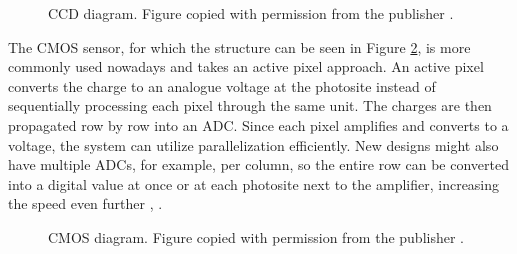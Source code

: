 \begin{figure}
    \centering
    \caption{CCD diagram. Figure copied with permission from the publisher \cite[4]{Park2016}.}
    \label{fig:ccd}
\end{figure}

 The CMOS sensor, for which the structure can be seen in Figure \ref{fig:cmos}, is more commonly used nowadays and takes an active pixel approach. An active pixel converts the charge to an analogue voltage at the photosite instead of sequentially processing each pixel through the same unit. The charges are then propagated row by row into an ADC. Since each pixel amplifies and converts to a voltage, the system can utilize parallelization efficiently. New designs might also have multiple ADCs, for example, per column, so the entire row can be converted into a digital value at once or at each photosite next to the amplifier, increasing the speed even further  \cite[144-176]{nakamura}, \cite[5]{Park2016}.

\begin{figure}
    \centering
    \caption{CMOS diagram. Figure copied with permission from the publisher \cite[5]{Park2016}.}
    \label{fig:cmos}
\end{figure}



